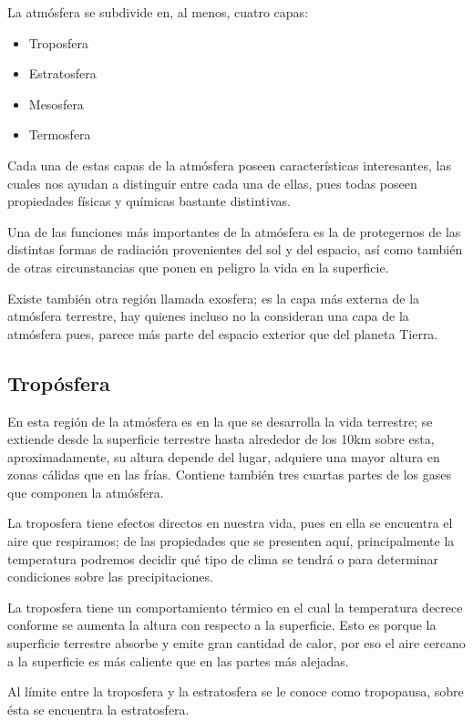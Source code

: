 \documentclass[12pt]{article}
\begin{document}
La atmósfera se subdivide en, al menos, cuatro capas:

    \begin{itemize}
    \item Troposfera
    \item Estratosfera
    \item Mesosfera
    \item Termosfera
    \end{itemize}

Cada una de estas capas de la atmósfera poseen características  interesantes, las cuales nos ayudan a distinguir entre cada una de ellas, pues todas poseen propiedades físicas y químicas bastante distintivas.

Una de las funciones más importantes de la atmósfera es la de protegernos de las distintas formas de radiación provenientes del sol y del espacio, así como también de otras circunstancias que ponen en peligro la vida en la superficie.

Existe también otra región llamada exosfera; es la capa más externa de la atmósfera terrestre, hay quienes incluso no la consideran una capa de la atmósfera pues, parece más parte del espacio exterior que del planeta Tierra.

    \subsection{Tropósfera}
    En esta región de la atmósfera es en la que se desarrolla la vida terrestre; se extiende desde la superficie terrestre hasta alrededor de los 10km sobre esta, aproximadamente, su altura depende del lugar, adquiere una mayor altura en zonas cálidas que en las frías\cite{ncsu}. Contiene también tres cuartas partes de los gases que componen la atmósfera.
    
    La troposfera tiene efectos directos en nuestra vida, pues en ella se encuentra el aire que respiramos; de las propiedades que se presenten aquí, principalmente la temperatura podremos decidir qué tipo de clima se tendrá o para determinar  condiciones sobre las precipitaciones.
    

    La troposfera tiene un comportamiento térmico en el cual la temperatura decrece conforme se aumenta la altura con respecto a la superficie. Esto es porque la superficie terrestre absorbe y emite gran cantidad de calor, por eso el aire cercano a la superficie es más caliente que en las partes más alejadas.

    Al límite entre la troposfera y la estratosfera se le conoce como tropopausa, sobre ésta se encuentra la estratosfera.\cite{ncsu}
\end{document}
